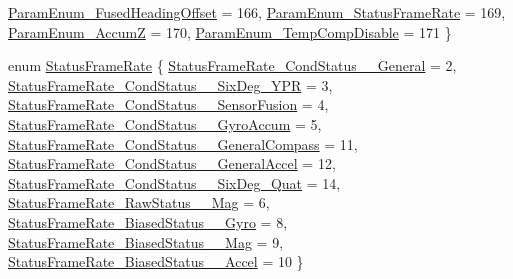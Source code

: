 \begin{DoxyCompactItemize}
\hyperlink{class_pigeon_imu_a9c6cc7a5797d5fce467e31040e1dbb2aad58ef8e6394929c1c37f4cfab8456d04}{Param\+Enum\+\_\+\+Fused\+Heading\+Offset} = 166, 
\hyperlink{class_pigeon_imu_a9c6cc7a5797d5fce467e31040e1dbb2aa3c00ec12073702b7247942196e053e28}{Param\+Enum\+\_\+\+Status\+Frame\+Rate} = 169, 
\newline
\hyperlink{class_pigeon_imu_a9c6cc7a5797d5fce467e31040e1dbb2aaf36f77682c0d9c3f0cf057dfc17d0b93}{Param\+Enum\+\_\+\+AccumZ} = 170, 
\hyperlink{class_pigeon_imu_a9c6cc7a5797d5fce467e31040e1dbb2aa8953bc67c4e9686d9e251b71d1e44ae7}{Param\+Enum\+\_\+\+Temp\+Comp\+Disable} = 171
 \}
\item 
enum \hyperlink{class_pigeon_imu_a655b831f9be6c185f1cc553679776b31}{Status\+Frame\+Rate} \{ \newline
\hyperlink{class_pigeon_imu_a655b831f9be6c185f1cc553679776b31a09296f972dd7f21cc4f22245c5e5b835}{Status\+Frame\+Rate\+\_\+\+Cond\+Status\+\_\+\_\+\+General} = 2, 
\hyperlink{class_pigeon_imu_a655b831f9be6c185f1cc553679776b31aec4077fb57859b40deac23b066f45312}{Status\+Frame\+Rate\+\_\+\+Cond\+Status\+\_\+\_\+\+Six\+Deg\+\_\+\+Y\+PR} = 3, 
\hyperlink{class_pigeon_imu_a655b831f9be6c185f1cc553679776b31a970e28c94828d06b925d9bd3eaf02fed}{Status\+Frame\+Rate\+\_\+\+Cond\+Status\+\_\+\_\+\+Sensor\+Fusion} = 4, 
\hyperlink{class_pigeon_imu_a655b831f9be6c185f1cc553679776b31a557e9194253f229507d6dabeb62b9975}{Status\+Frame\+Rate\+\_\+\+Cond\+Status\+\_\+\_\+\+Gyro\+Accum} = 5, 
\newline
\hyperlink{class_pigeon_imu_a655b831f9be6c185f1cc553679776b31ad9dc98daa45788b2e2a7547b56ed7a1e}{Status\+Frame\+Rate\+\_\+\+Cond\+Status\+\_\+\_\+\+General\+Compass} = 11, 
\hyperlink{class_pigeon_imu_a655b831f9be6c185f1cc553679776b31a47da97decd9600d8917fabecf0051b9a}{Status\+Frame\+Rate\+\_\+\+Cond\+Status\+\_\+\_\+\+General\+Accel} = 12, 
\hyperlink{class_pigeon_imu_a655b831f9be6c185f1cc553679776b31a90e6315b7550712faacec9b924a4c57a}{Status\+Frame\+Rate\+\_\+\+Cond\+Status\+\_\+\_\+\+Six\+Deg\+\_\+\+Quat} = 14, 
\hyperlink{class_pigeon_imu_a655b831f9be6c185f1cc553679776b31aec813504d64ac11b40f1d6416d169a24}{Status\+Frame\+Rate\+\_\+\+Raw\+Status\+\_\+\_\+\+Mag} = 6, 
\newline
\hyperlink{class_pigeon_imu_a655b831f9be6c185f1cc553679776b31a6a3806c0e335af403c1c9d35d438c6f3}{Status\+Frame\+Rate\+\_\+\+Biased\+Status\+\_\+\_\+\+Gyro} = 8, 
\hyperlink{class_pigeon_imu_a655b831f9be6c185f1cc553679776b31a82d556e30f04a6a9a082df7b8717a7a9}{Status\+Frame\+Rate\+\_\+\+Biased\+Status\+\_\+\_\+\+Mag} = 9, 
\hyperlink{class_pigeon_imu_a655b831f9be6c185f1cc553679776b31ad31ba65806915d6f6ba96b328e0036d7}{Status\+Frame\+Rate\+\_\+\+Biased\+Status\+\_\+\_\+\+Accel} = 10
 \}
\end{DoxyCompactItemize}
